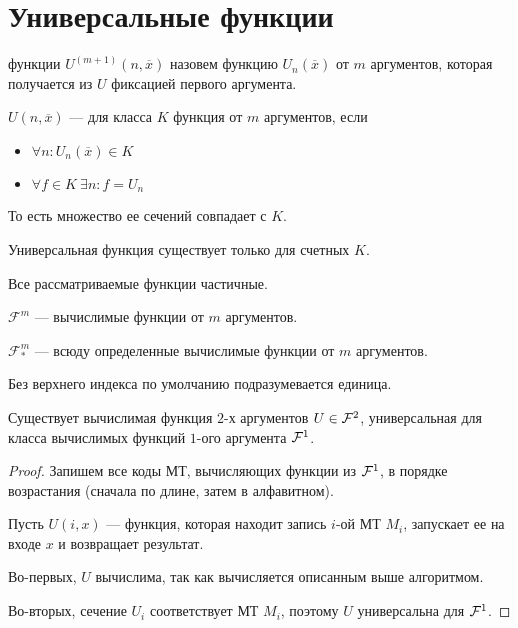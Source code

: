 \section{Универсальные функции}
\begin{defn}
	 функции $ U^{(m+1)}(n, \overline{x})$ назовем функцию $ U_n(\overline{x})$ от $ m$ аргументов, которая получается из $ U$ фиксацией первого аргумента.
\end{defn}
\begin{defn}
$ U(n, \overline{x})$ ---  для класса $ K$ функция от $ m$ аргументов, если 
	\begin{itemize}
		\item $ \forall n \colon  U_n(\overline{x}) \in K$
		\item $ \forall f \in K ~ \exists n \colon f = U_{n}$
	\end{itemize}
	То есть множество ее сечений совпадает с $ K$.
\end{defn}

\begin{note}
    Универсальная функция существует только для счетных $ K$.
\end{note}
\begin{note}
    Все рассматриваемые функции частичные.
\end{note}
\begin{name}
	$ \mathcal{F}^{m}$ --- вычислимые функции от $  m$ аргументов.

	$ \mathcal{F}^{m}_{*}$ --- всюду определенные вычислимые функции от $  m$ аргументов. 

	Без верхнего индекса по умолчанию подразумевается единица.
\end{name}

\begin{thm}
    Существует вычислимая функция $ 2$-х аргументов $ U \in  \mathcal{F}^2$, универсальная для класса вычислимых функций $ 1$-ого аргумента $ \mathcal{F}^{1}$.
\end{thm}
\begin{proof}
	Запишем все коды МТ, вычисляющих функции из $ \mathcal{F}^1$, в порядке возрастания (сначала по длине, затем в алфавитном).

	Пусть $ U(i, x)$ --- функция, которая находит запись $ i$-ой МТ $ M_i$, запускает ее на входе $ x$ и возвращает результат.

	Во-первых, $ U $  вычислима, так как вычисляется описанным выше алгоритмом.

	Во-вторых, сечение $ U_i$ соответствует МТ $ M_i$, поэтому $ U$ универсальна для $ \mathcal{F}^{1}$.
\end{proof}


